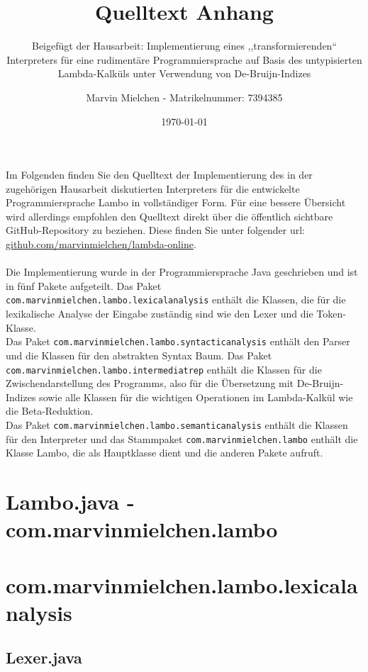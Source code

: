 \documentclass{article}
\title{Quelltext Anhang}
\author{Marvin Mielchen - Matrikelnummer: 7394385}
\subtitle{Beigefügt der Hausarbeit: Implementierung eines ,,transformierenden“ Interpreters für eine rudimentäre Programmiersprache auf Basis des untypisierten Lambda-Kalküls unter Verwendung von De-Bruijn-Indizes}
\date{\today}
\begin{document}
\maketitle
Im Folgenden finden Sie den Quelltext der Implementierung des in der zugehörigen Hausarbeit diskutierten Interpreters für die entwickelte Programmiersprache Lambo in vollständiger Form. Für eine bessere Übersicht wird allerdings empfohlen den Quelltext direkt über die öffentlich sichtbare GitHub-Repository zu beziehen. Diese finden Sie unter folgender url: \href{https://github.com/marvinmielchen/lambda-online}{github.com/marvinmielchen/lambda-online}.\\\\
Die Implementierung wurde in der Programmiersprache Java geschrieben und ist in fünf Pakete aufgeteilt. 
Das Paket \texttt{com.marvinmielchen.lambo.lexicalanalysis} enthält die Klassen, die für die lexikalische Analyse der Eingabe zuständig sind wie den Lexer und die Token-Klasse. 
\\Das Paket \texttt{com.marvinmielchen.lambo.syntacticanalysis} enthält den Parser und die Klassen für den abstrakten Syntax Baum. 
Das Paket \texttt{com.marvinmielchen.lambo.intermediatrep} enthält die Klassen für die Zwischendarstellung des Programms, also für die Übersetzung mit De-Bruijn-Indizes sowie alle Klassen für die wichtigen Operationen im Lambda-Kalkül wie die Beta-Reduktion. 
\\Das Paket \texttt{com.marvinmielchen.lambo.semanticanalysis} enthält die Klassen für den Interpreter und das Stammpaket \texttt{com.marvinmielchen.lambo} enthält die Klasse Lambo, die als Hauptklasse dient und die anderen Pakete aufruft.

\newpage
\tableofcontents

\newpage

\section{Lambo.java - com.marvinmielchen.lambo}


\section{com.marvinmielchen.lambo.lexicalanalysis}

\subsection{Lexer.java}

\end{document}
